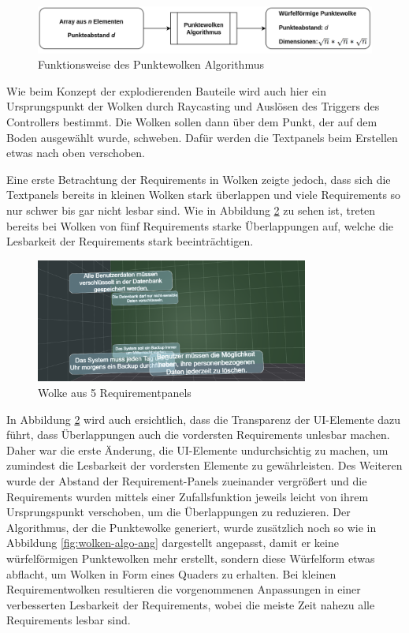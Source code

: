 \begin{figure}[H]
    \centering
    \includegraphics[width=1\textwidth]{images/WolkenAlgo.png}
    \caption{Funktionsweise des Punktewolken Algorithmus}
    \label{fig:wolken-algo}
\end{figure}


Wie beim Konzept der explodierenden Bauteile wird auch hier ein Ursprungspunkt der Wolken durch Raycasting und Auslösen des Triggers des Controllers bestimmt.
Die Wolken sollen dann über dem Punkt, der auf dem Boden ausgewählt wurde, schweben.
Dafür werden die Textpanels beim Erstellen etwas nach oben verschoben.

\newpage

Eine erste Betrachtung der Requirements in Wolken zeigte jedoch, dass sich die Textpanels bereits in kleinen Wolken stark überlappen und viele Requirements so nur schwer bis gar nicht lesbar sind.
Wie in Abbildung \ref{fig:wolken-prototyp} zu sehen ist, treten bereits bei Wolken von fünf Requirements starke Überlappungen auf, welche die Lesbarkeit der Requirements stark beeinträchtigen.

\begin{figure}[H]
    \centering
    \includegraphics[width=0.8\textwidth]{images/WolkenPrototyp.png}
    \caption{Wolke aus 5 Requirementpanels}
    \label{fig:wolken-prototyp}
\end{figure}

In Abbildung \ref{fig:wolken-prototyp} wird auch ersichtlich, dass die Transparenz der UI-Elemente dazu führt, dass Überlappungen auch die vordersten Requirements unlesbar machen.
Daher war die erste Änderung, die UI-Elemente undurchsichtig zu machen, um zumindest die Lesbarkeit der vordersten Elemente zu gewährleisten.
Des Weiteren wurde der Abstand der Requirement-Panels zueinander vergrößert und die Requirements wurden mittels einer Zufallsfunktion jeweils leicht von ihrem Ursprungspunkt verschoben, um die Überlappungen zu reduzieren.
Der Algorithmus, der die Punktewolke generiert, wurde zusätzlich noch so wie in Abbildung \ref{fig:wolken-algo-ang} dargestellt angepasst, damit er keine würfelförmigen Punktewolken mehr erstellt, sondern diese Würfelform etwas abflacht, um Wolken in Form eines Quaders zu erhalten.
Bei kleinen Requirementwolken resultieren die vorgenommenen Anpassungen in einer verbesserten Lesbarkeit der Requirements, wobei die meiste Zeit nahezu alle Requirements lesbar sind.

